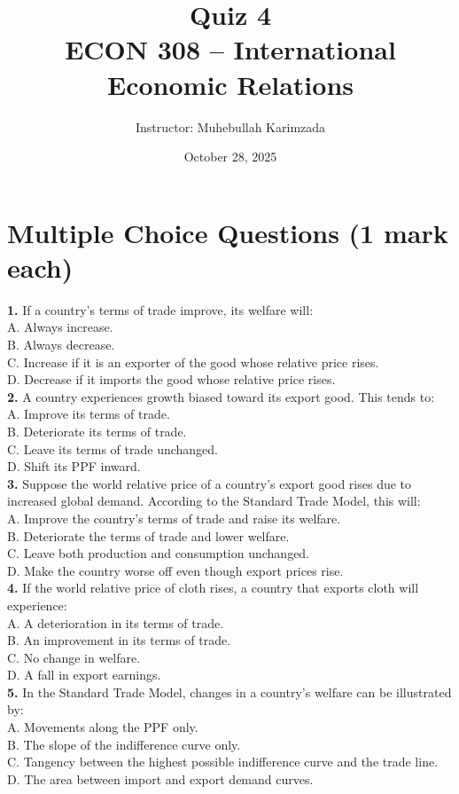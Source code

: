 \documentclass[12pt]{article}
\title{Quiz 4\\ \vspace{8pt} \Large ECON 308 -- International Economic Relations}
\author{Instructor: Muhebullah Karimzada}
\date{October 28,  2025}
\begin{document}
\maketitle

\section*{Multiple Choice Questions (1 mark each)}

\textbf{1.} If a country’s terms of trade improve, its welfare will: \\[3pt]
A. Always increase. \\
B. Always decrease. \\
C. Increase if it is an exporter of the good whose relative price rises. \\
D. Decrease if it imports the good whose relative price rises. \\[10pt]

\textbf{2.} A country experiences growth biased toward its export good. This tends to: \\[3pt]
A. Improve its terms of trade. \\
B. Deteriorate its terms of trade. \\
C. Leave its terms of trade unchanged. \\
D. Shift its PPF inward. \\[10pt]

\textbf{3.} Suppose the world relative price of a country’s export good rises due to increased global demand. According to the Standard Trade Model, this will: \\[3pt]
A. Improve the country’s terms of trade and raise its welfare. \\
B. Deteriorate the terms of trade and lower welfare. \\
C. Leave both production and consumption unchanged. \\
D. Make the country worse off even though export prices rise. \\[10pt]

\textbf{4.} If the world relative price of cloth rises, a country that exports cloth will experience: \\[3pt]
A. A deterioration in its terms of trade. \\
B. An improvement in its terms of trade. \\
C. No change in welfare. \\
D. A fall in export earnings. \\[10pt]
\newpage
\textbf{5.} In the Standard Trade Model, changes in a country’s welfare can be illustrated by: \\[3pt]
A. Movements along the PPF only. \\
B. The slope of the indifference curve only. \\
C. Tangency between the highest possible indifference curve and the trade line. \\
D. The area between import and export demand curves. \\[14pt]
\end{document}
